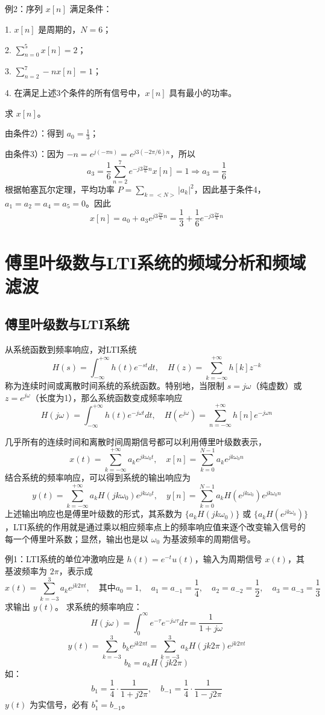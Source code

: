 \documentclass[UTF8]{report}
\theoremstyle{MyLineTheoremStyle} %
\theoremstyle{MyBlockTheoremStyle} %
\theoremstyle{MySubsubsectionStyle} %
\begin{document}
例2：序列 $x[n]$ 满足条件：\par
1. $x[n]$ 是周期的，$N = 6$；\par
2. $\sum_{n=0}^{5} x[n] = 2$；\par
3. $\sum_{n=2}^{7} -n x[n] = 1$；\par
4. 在满足上述3个条件的所有信号中，$x[n]$ 具有最小的功率。\par
求 $x[n]$。

由条件2）：得到 $a_0 = \frac{1}{3}$；\par
由条件3）：因为 $-n = e^{j(-\pi n)} = e^{j3(-2\pi/6)n}$，所以
\[
a_3 = \frac{1}{6} \sum_{n=2}^{7} e^{-j3 \frac{2\pi}{6} n} x[n] = 1 \Rightarrow a_3 = \frac{1}{6}
\]
根据帕塞瓦尔定理，平均功率 $P = \sum_{k=<N>} |a_k|^2$，因此基于条件4，$a_1 = a_2 = a_4 = a_5 = 0$。因此
\[
x[n] = a_0 + a_3 e^{j3 \frac{2\pi}{6} n} = \frac{1}{3} + \frac{1}{6} e^{-j3 \frac{2\pi}{6} n}
\]




\section{傅里叶级数与LTI系统的频域分析和频域滤波}

\subsection{傅里叶级数与LTI系统}

从系统函数到频率响应，对LTI系统
\[
H(s) = \int_{-\infty}^{+\infty} h(t) e^{-st} dt, \quad H(z) = \sum_{k=-\infty}^{+\infty} h[k] z^{-k}
\]
称为连续时间或离散时间系统的系统函数。特别地，当限制 $s = j\omega$（纯虚数）或 $z = e^{j\omega}$（长度为1），那么系统函数变成频率响应
\[
H(j\omega) = \int_{-\infty}^{+\infty} h(t) e^{-j\omega t} dt, \quad H(e^{j\omega}) = \sum_{n=-\infty}^{+\infty} h[n] e^{-j\omega n}
\]

几乎所有的连续时间和离散时间周期信号都可以利用傅里叶级数表示，
\[
x(t) = \sum_{k=-\infty}^{+\infty} a_k e^{jk\omega_0 t}, \quad x[n] = \sum_{k=0}^{N-1} a_k e^{jk\omega_0 n}
\]
结合系统的频率响应，可以得到系统的输出响应为
\[
y(t) = \sum_{k=-\infty}^{+\infty} a_k H(jk\omega_0) e^{jk\omega_0 t}, \quad y[n] = \sum_{k=0}^{N-1} a_k H(e^{jk\omega_0}) e^{jk\omega_0 n}
\]
上述输出响应也是傅里叶级数的形式，其系数为 $\{a_k H(jk\omega_0)\}$ 或 $\{a_k H(e^{jk\omega_0})\}$，LTI系统的作用就是通过乘以相应频率点上的频率响应值来逐个改变输入信号的每一个傅里叶系数；显然，输出也是以 $\omega_0$ 为基波频率的周期信号。

例1：LTI系统的单位冲激响应是 $h(t) = e^{-t}u(t)$，输入为周期信号 $x(t)$，其基波频率为 $2\pi$，表示成
\[
x(t) = \sum_{k=-3}^{3} a_k e^{jk2\pi t}, \quad \text{其中} a_0 = 1, \quad a_1 = a_{-1} = \frac{1}{4}, \quad a_2 = a_{-2} = \frac{1}{2}, \quad a_3 = a_{-3} = \frac{1}{3}
\]
求输出 $y(t)$。
求系统的频率响应：
\[
H(j\omega) = \int_{0}^{\infty} e^{-\tau} e^{-j\omega \tau} d\tau = \frac{1}{1 + j\omega}
\]
\[
y(t) = \sum_{k=-3}^{3} b_k e^{jk2\pi t} = \sum_{k=-3}^{3} a_k H(jk2\pi) e^{jk2\pi t}
\]
\[
b_k = a_k H(jk2\pi)
\]
如：
\[
b_1 = \frac{1}{4} \cdot \frac{1}{1 + j2\pi}, \quad b_{-1} = \frac{1}{4} \cdot \frac{1}{1 - j2\pi}
\]
$y(t)$ 为实信号，必有 $b_1^* = b_{-1}$。
\end{document}
